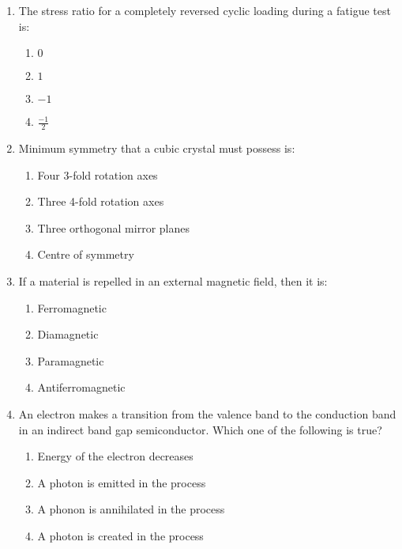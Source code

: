 \documentclass[journal,12pt,onecolumn]{IEEEtran}
\theoremstyle{remark}
\begin{document}
\begin{enumerate}
    \begin{figure}[H]
        \centering
    \end{figure}

    \item The stress ratio for a completely reversed cyclic loading during a fatigue test is:
        \begin{multicols}{4}

    \begin{enumerate}
        \item $0$
        \item $1$
        \item $-1$
        \item $\frac{-1}{2}$
    \end{enumerate}
    \end{multicols}

    \item Minimum symmetry that a cubic crystal must possess is:
    
    \begin{enumerate}
        \item Four 3-fold rotation axes
        \item Three 4-fold rotation axes
        \item Three orthogonal mirror planes
        \item Centre of symmetry
    \end{enumerate}

    \item If a material is repelled in an external magnetic field, then it is:
        \begin{multicols}{2}

    \begin{enumerate}
        \item Ferromagnetic
        \item Diamagnetic
        \item Paramagnetic
        \item Antiferromagnetic
    \end{enumerate}
    \end{multicols}

    \item An electron makes a transition from the valence band to the conduction band in an indirect band gap semiconductor. Which one of the following is true?
    
    \begin{enumerate}
        \item Energy of the electron decreases
        \item A photon is emitted in the process
        \item A phonon is annihilated in the process
        \item A photon is created in the process
    \end{enumerate}


\end{enumerate}
\end{document}
